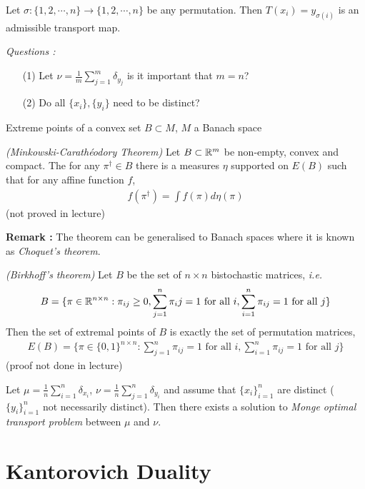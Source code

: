 \documentclass[10pt,a4paper]{article}
\begin{document}
Let $\sigma : \{1, 2, \cdots ,n \} \rightarrow \{1, 2, \cdots ,n \}$ be any permutation. Then $T(x_i) = y_{\sigma(i)}$ is an admissible transport map.
\s

\emph{Questions :}
\begin{itemize}
\item[(1)] Let $\nu =\frac{1}{m}\sum_{j=1}^m \delta_{y_j}$ is it important that $m=n$? 
\item[(2)] Do all $\{x_i\},\{y_i\}$ need to be distinct? 
\end{itemize}
\s

 Extreme points of a convex set $B\subset M$, $M$ a Banach space
\s

 \emph{(Minkowski-Carath\'{e}odory Theorem)} Let $B\subset \mathbb{R}^m$ be non-empty, convex and compact. The for any $\pi^{\dagger} \in B$ there is a measures $\eta$ supported on $E(B)$ such that for any affine function $f$,
\begin{align*}
f(\pi^{\dagger}) = \int f(\pi) d\eta(\pi)
\end{align*}
(not proved in lecture)
\s

\textbf{Remark : } The theorem can be generalised to Banach spaces where it is known as \emph{Choquet's theorem}.
\s

 \emph{(Birkhoff's theorem)} Let $B$ be the set of $n\times n$ bistochastic matrices, \textit{i.e.}
\begin{align*}
B =\{ \pi \in \mathbb{R}^{n\times n} : \pi_{ij} \geq 0, \sum_{j=1}^n \pi_ij =1 \text{ for all } i, \sum_{i=1}^n \pi_{ij}=1 \text{ for all  }j\}
\end{align*}
Then the set of extremal points of $B$ is exactly the set of permutation matrices, 
\begin{align*}
E(B) = \{\pi \in \{0,1\}^{n\times n} : \sum_{j=1}^n \pi_{ij}=1\text{ for all }i, \sum_{i=1}^n \pi_{ij}=1 \text{ for all }j \}
\end{align*}
(proof not done in lecture)
\s

 Let $\mu = \frac{1}{n} \sum_{i=1}^n \delta_{x_i}$, $\nu = \frac{1}{n} \sum_{j=1}^n \delta_{y_i}$ and assume that $\{x_i \}_{i=1}^n$ are distinct ($\{y_i\}_{i=1}^n$ not necessarily distinct). Then there exists a solution to \emph{Monge optimal transport problem} between $\mu$ and $\nu$. 
\s

\section{Kantorovich Duality}
\end{document}
